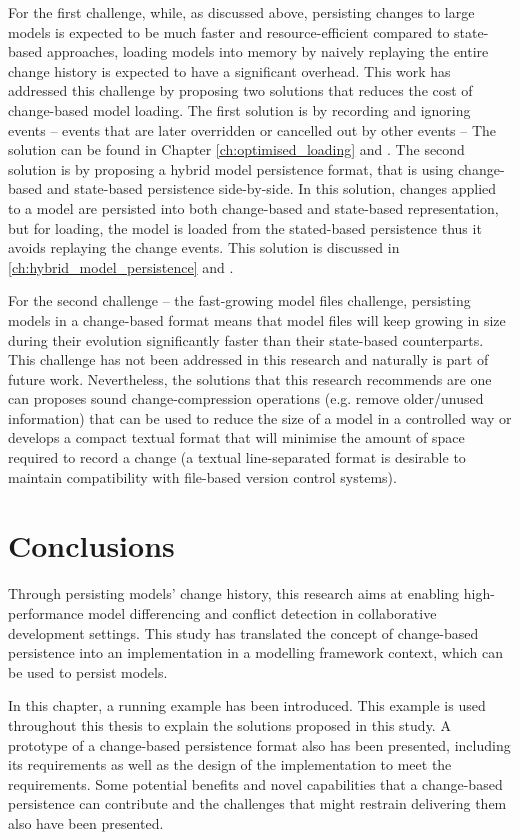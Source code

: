 For the first challenge, while, as discussed above, persisting changes to large models is expected to be much faster and resource-efficient compared to state-based approaches, loading models into memory by naively replaying the entire change history is expected to have a significant overhead. This work has addressed this challenge by proposing two solutions that reduces the cost of change-based model loading. The first solution is by recording and ignoring events -- events that are later overridden or cancelled out by other events -- The solution can be found in Chapter \ref{ch:optimised_loading} and \cite{yohannis2018towards}. The second solution is by proposing a hybrid model persistence format, that is using change-based and state-based persistence side-by-side. In this solution, changes applied to a model are persisted into both change-based and state-based representation, but for loading, the model is loaded from the stated-based persistence thus it avoids replaying the change events. This solution is discussed in \ref{ch:hybrid_model_persistence} and \cite{DBLP:conf/models/YohannisRPK18}. 

For the second challenge -- the fast-growing model files challenge, persisting models in a change-based format means that model files will keep growing in size during their evolution significantly faster than their state-based counterparts. This challenge has not been addressed in this research and naturally is part of future work. Nevertheless, the solutions that this research recommends are one can proposes sound change-compression operations (e.g. remove older/unused information) that can be used to reduce the size of a model in a controlled way or develops a compact textual format that will minimise the amount of space required to record a change (a textual line-separated format is desirable to maintain compatibility with file-based version control systems).   

\section{Conclusions}
\label{sec:conclusions_3}
Through persisting models' change history, this research aims at enabling high-performance model differencing and conflict detection in collaborative development settings. This study has translated the concept of change-based persistence into an implementation in a modelling framework context, which can be used to persist models. 

In this chapter, a running example has been introduced. This example is used throughout this thesis to explain the solutions proposed in this study. A prototype of a change-based persistence format also has been presented, including its requirements as well as the design of the implementation to meet the requirements. Some potential benefits and novel capabilities that a change-based persistence can contribute and the challenges that might restrain delivering them also have been presented.   

